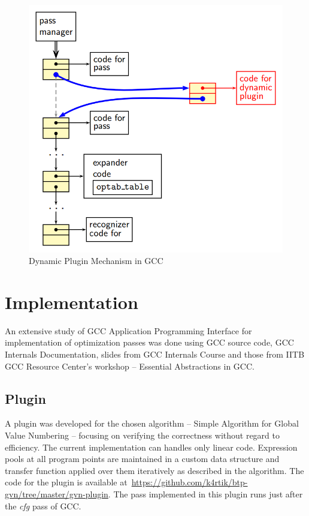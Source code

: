 \begin{figure}[htb]
\centering
\includegraphics[scale=0.65]{./dynamic-plugin1}
\caption{Dynamic Plugin Mechanism in GCC\cite{grc}}
\label{fig:dynamic-plugin}
\end{figure}

\pagebreak
\section{Implementation}
An extensive study of GCC Application Programming Interface for implementation of optimization passes was done using GCC source code, GCC Internals Documentation\cite{gccint}, slides from GCC Internals Course\cite{dnovillo} and those from IITB GCC Resource Center's workshop -- Essential Abstractions in GCC\cite{grc}.

\subsection{Plugin}
A plugin was developed for the chosen algorithm -- Simple Algorithm for Global Value Numbering\cite{sagvn} -- focusing on verifying the correctness without regard to efficiency. The current implementation can handles only linear code. Expression pools at all program points are maintained in a custom data structure and transfer function applied over them iteratively as described in the algorithm\cite{sagvn}. The code for the plugin is available at\ \url{https://github.com/k4rtik/btp-gvn/tree/master/gvn-plugin}. The pass implemented in this plugin runs just after the \emph{cfg} pass of GCC.

